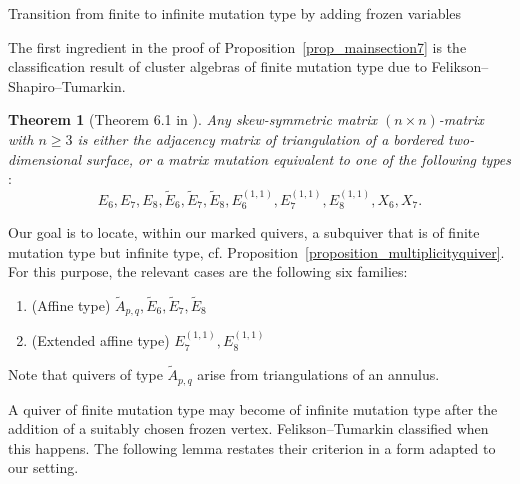 \documentclass[11pt]{amsart}
\makeatletter
\def\subsection{\@startsection{subsection}{2}%
  \z@{-.8\linespacing\@plus-.3\linespacing}{.3\linespacing\@plus.2\linespacing}%
  {\normalfont\bfseries}}
\numberwithin{equation}{section}
\theoremstyle{plain}
\newtheorem{theorem}{Theorem}[section]
\theoremstyle{definition}
\numberwithin{equation}{section}
\makeatother
\begin{document}
\subsection{Transition from finite to infinite mutation type by adding frozen variables}

The first ingredient in the proof of Proposition~\ref{prop_mainsection7} is the classification result of cluster algebras of finite mutation type due to Felikson--Shapiro--Tumarkin.

\begin{theorem}[Theorem 6.1 in \cite{FST12}]\label{theorem_FST61}
Any skew-symmetric matrix $(n \times n)$-matrix with $n \geq 3$ is either the adjacency matrix of triangulation of a bordered two-dimensional surface, or a matrix mutation equivalent to one of the following types$\colon$
$$
E_6, E_7, E_8, \widetilde{E}_6, \widetilde{E}_7, \widetilde{E}_8, E^{(1,1)}_6, E^{(1,1)}_7, E^{(1,1)}_8, X_6, X_7. 
$$
\end{theorem}

Our goal is to locate, within our marked quivers, a subquiver that is of finite mutation type but infinite type, cf. Proposition~\ref{proposition_multiplicityquiver}. For this purpose, the relevant cases are the following six families:
\begin{enumerate}
\item (Affine type) $\widetilde{A}_{p,q},  \widetilde{E}_6, \widetilde{E}_7, \widetilde{E}_8$ 
\item (Extended affine type) $E^{(1,1)}_7, E^{(1,1)}_8$
\end{enumerate}
Note that quivers of type $\widetilde{A}_{p,q}$ arise from triangulations of an annulus. 

A quiver of finite mutation type may become of infinite mutation type after the addition of a suitably chosen frozen vertex. Felikson--Tumarkin \cite{FT24} classified when this happens. The following lemma restates their criterion in a form adapted to our setting.
\end{document}
